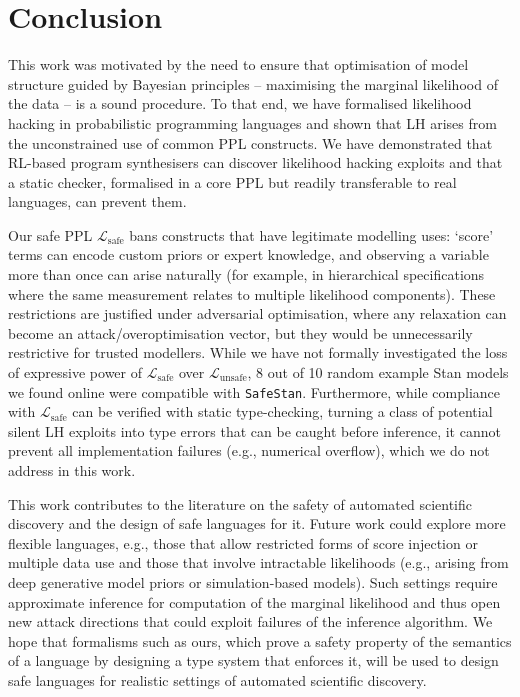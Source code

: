 \documentclass[preprint]{uai2026} %
\newcommand{\Lsafe}{\mathcal{L}_{\text{safe}}}
\newcommand{\Lunsafe}{\mathcal{L}_{\text{unsafe}}}
\begin{document}
\section{Conclusion}

This work was motivated by the need to ensure that optimisation of model structure guided by Bayesian principles -- maximising the marginal likelihood of the data -- is a sound procedure. To that end, we have formalised likelihood hacking in probabilistic programming languages and shown that LH arises from the unconstrained use of common PPL constructs. We have demonstrated that RL-based program synthesisers can discover likelihood hacking exploits and that a static checker, formalised in a core PPL but readily transferable to real languages, can prevent them.

Our safe PPL $\Lsafe$ bans constructs that have legitimate modelling uses: `score' terms can encode custom priors or expert knowledge, and observing a variable more than once can arise naturally (for example, in hierarchical specifications where the same measurement relates to multiple likelihood components). These restrictions are justified under adversarial optimisation, where any relaxation can become an attack/overoptimisation vector, but they would be unnecessarily restrictive for trusted modellers. While we have not formally investigated the loss of expressive power of $\Lsafe$ over $\Lunsafe$, 8 out of 10 random example Stan models we found online were compatible with \texttt{SafeStan}. Furthermore, while compliance with $\Lsafe$ can be verified with static type-checking, turning a class of potential silent LH exploits into type errors that can be caught before inference, it cannot prevent all implementation failures (e.g., numerical overflow), which we do not address in this work.

This work contributes to the literature on the safety of automated scientific discovery and the design of safe languages for it. Future work could explore more flexible languages, e.g., those that allow restricted forms of score injection or multiple data use and those that involve intractable likelihoods (e.g., arising from deep generative model priors or simulation-based models). Such settings require approximate inference for computation of the marginal likelihood and thus open new attack directions that could exploit failures of the inference algorithm. We  hope that formalisms such as ours, which prove a safety property of the semantics of a language by designing a type system that enforces it, will be used to design safe languages for realistic settings of automated scientific discovery.
\end{document}
